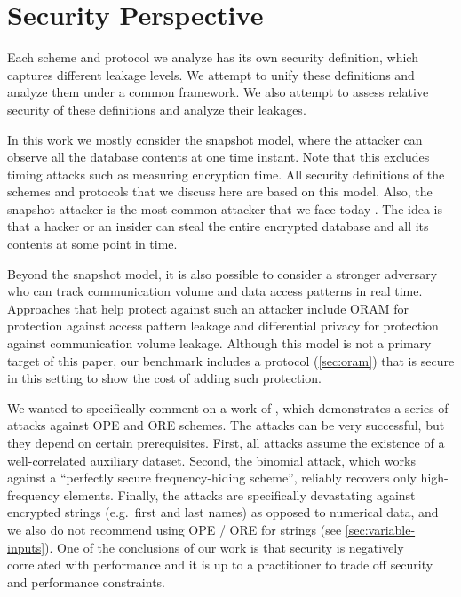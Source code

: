 \section{Security Perspective}\label{sec:security}

	Each scheme and protocol we analyze has its own security definition, which captures different leakage levels.
	We attempt to unify these definitions and analyze them under a common framework.
	We also attempt to assess relative security of these definitions and analyze their leakages.

	In this work we mostly consider the snapshot model, where the attacker can observe all the database contents at one time instant.
	Note that this excludes timing attacks such as measuring encryption time.
	All security definitions of the schemes and protocols that we discuss here are based on this model.
	Also, the snapshot attacker is the most common attacker that we face today \cite{secure-queries-overview}.
	The idea is that a hacker or an insider can steal the entire encrypted database and all its contents at some point in time.

	Beyond the snapshot model, it is also possible to consider a stronger adversary who can track communication volume and data access patterns in real time.
	Approaches that help protect against such an attacker include ORAM for protection against access pattern leakage and differential privacy for protection against communication volume leakage.
	Although this model is not a primary target of this paper, our benchmark includes a protocol (\cref{sec:oram}) that is secure in this setting to show the cost of adding such protection.

	We wanted to specifically comment on a work of \textcite{leakage-abuse-grubs-2017}, which demonstrates a series of attacks against OPE and ORE schemes.
	The attacks can be very successful, but they depend on certain prerequisites.
	First, all attacks assume the existence of a well-correlated auxiliary dataset.
	Second, the binomial attack, which works against a ``perfectly secure frequency-hiding scheme'', reliably recovers only high-frequency elements.
	Finally, the attacks are specifically devastating against encrypted strings (e.g.\ first and last names) as opposed to numerical data, and we also do not recommend using OPE / ORE for strings (see \cref{sec:variable-inputs}).
	One of the conclusions of our work is that security is negatively correlated with performance and it is up to a practitioner to trade off security and performance constraints.

